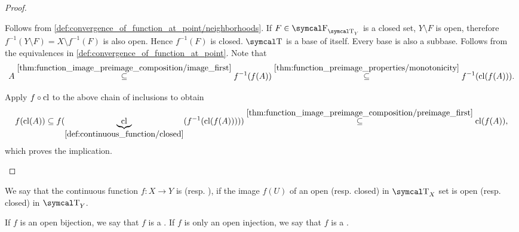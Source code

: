 \begin{proof}
  \begin{description}
     Follows from \cref{def:convergence_of_function_at_point/neighborhoods}.
     If \( F \in \CF_{\CT_Y} \) is a closed set, \( Y \setminus F \) is open, therefore \( f^{-1}(Y \setminus F) = X \setminus f^{-1}(F) \) is also open. Hence \( f^{-1}(F) \) is closed.
     \( \CT \) is a base of itself.
     Every base is also a subbase.
     Follows from the equivalences in \cref{def:convergence_of_function_at_point}.
     Note that
    \begin{equation*}
      A
      \overset {\ref{thm:function_image_preimage_composition/image_first}} \subseteq
      f^{-1}(f(A))
      \overset {\ref{thm:function_preimage_properties/monotonicity}} \subseteq
      f^{-1}(\operatorname{cl}(f(A))).
    \end{equation*}

    Apply \( f \circ \operatorname{cl} \) to the above chain of inclusions to obtain
    \begin{equation*}
      f(\operatorname{cl}(A))
      \subseteq
      f(\underbrace{\operatorname{cl}}_{\ref{def:continuous_function/closed}}(f^{-1}(\operatorname{cl}(f(A)))))
      \overset {\ref{thm:function_image_preimage_composition/preimage_first}} \subseteq
      \operatorname{cl}(f(A)),
    \end{equation*}
    which proves the implication.

  \end{description}
\end{proof}

\begin{definition}\label{def:homeomorphism}
  We say that the continuous function \( f: X \to Y \) is  (resp. ), if the image \( f(U) \) of an open (resp. closed) in \( \CT_X \) set is open (resp. closed) in \( \CT_Y \).

  If \( f \) is an open bijection, we say that \( f \) is a . If \( f \) is only an open injection, we say that \( f \) is a .
\end{definition}

